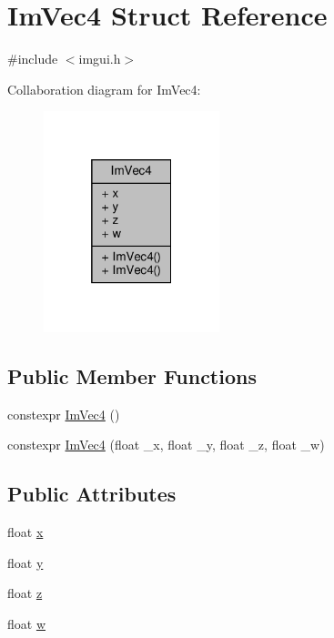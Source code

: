 \hypertarget{structImVec4}{}\section{Im\+Vec4 Struct Reference}
\label{structImVec4}


{\ttfamily \#include $<$imgui.\+h$>$}



Collaboration diagram for Im\+Vec4\+:
\nopagebreak
\begin{figure}[H]
\begin{center}
\leavevmode
\includegraphics[width=145pt]{structImVec4__coll__graph}
\end{center}
\end{figure}
\subsection*{Public Member Functions}
\begin{DoxyCompactItemize}
\item 
constexpr \hyperlink{structImVec4_a3844a618a19bddbe806b8ce0775bfb0e}{Im\+Vec4} ()
\item 
constexpr \hyperlink{structImVec4_ac05b0806cef1a557f8c386b1b4af6703}{Im\+Vec4} (float \+\_\+x, float \+\_\+y, float \+\_\+z, float \+\_\+w)
\end{DoxyCompactItemize}
\subsection*{Public Attributes}
\begin{DoxyCompactItemize}
\item 
float \hyperlink{structImVec4_a2090f651f5e5b78fedae8dab87343db6}{x}
\item 
float \hyperlink{structImVec4_a6b4d00ae261be4fe54353c759c561fe7}{y}
\item 
float \hyperlink{structImVec4_aba6a75356917a28c967954bb29133a1a}{z}
\item 
float \hyperlink{structImVec4_afeed5acd9f0d2043175f4da229d12a38}{w}
\end{DoxyCompactItemize}


